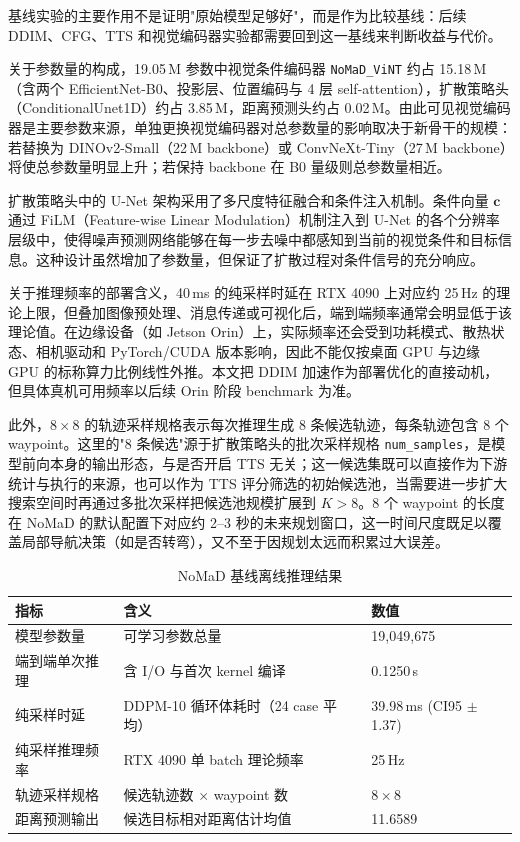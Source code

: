 基线实验的主要作用不是证明"原始模型足够好"，而是作为比较基线：后续 DDIM、CFG、TTS 和视觉编码器实验都需要回到这一基线来判断收益与代价。

关于参数量的构成，19.05\,M 参数中视觉条件编码器 \texttt{NoMaD\_ViNT} 约占 15.18\,M（含两个 EfficientNet-B0、投影层、位置编码与 4 层 self-attention），扩散策略头（ConditionalUnet1D）约占 3.85\,M，距离预测头约占 0.02\,M。由此可见视觉编码器是主要参数来源，单独更换视觉编码器对总参数量的影响取决于新骨干的规模：若替换为 DINOv2-Small（22\,M backbone）或 ConvNeXt-Tiny（27\,M backbone）将使总参数量明显上升；若保持 backbone 在 B0 量级则总参数量相近。

扩散策略头中的 U-Net 架构采用了多尺度特征融合和条件注入机制。条件向量 $\mathbf{c}$ 通过 FiLM（Feature-wise Linear Modulation）机制注入到 U-Net 的各个分辨率层级中，使得噪声预测网络能够在每一步去噪中都感知到当前的视觉条件和目标信息。这种设计虽然增加了参数量，但保证了扩散过程对条件信号的充分响应。

关于推理频率的部署含义，40\,ms 的纯采样时延在 RTX 4090 上对应约 25\,Hz 的理论上限，但叠加图像预处理、消息传递或可视化后，端到端频率通常会明显低于该理论值。在边缘设备（如 Jetson Orin）上，实际频率还会受到功耗模式、散热状态、相机驱动和 PyTorch/CUDA 版本影响，因此不能仅按桌面 GPU 与边缘 GPU 的标称算力比例线性外推。本文把 DDIM 加速作为部署优化的直接动机，但具体真机可用频率以后续 Orin 阶段 benchmark 为准。

此外，$8 \times 8$ 的轨迹采样规格表示每次推理生成 8 条候选轨迹，每条轨迹包含 8 个 waypoint。这里的"8 条候选"源于扩散策略头的批次采样规格 \texttt{num\_samples}，是模型前向本身的输出形态，与是否开启 TTS 无关；这一候选集既可以直接作为下游统计与执行的来源，也可以作为 TTS 评分筛选的初始候选池，当需要进一步扩大搜索空间时再通过多批次采样把候选池规模扩展到 $K > 8$。8 个 waypoint 的长度在 NoMaD 的默认配置下对应约 2--3 秒的未来规划窗口，这一时间尺度既足以覆盖局部导航决策（如是否转弯），又不至于因规划太远而积累过大误差。

\begin{table}[htbp]
    \centering
    \caption{NoMaD 基线离线推理结果}
    \label{tab:baseline-inference}
    \begin{tabular}{lll}
        \toprule
        指标 & 含义 & 数值 \\
        \midrule
        模型参数量 & 可学习参数总量 & 19,049,675 \\
        端到端单次推理 & 含 I/O 与首次 kernel 编译 & 0.1250\,s \\
        纯采样时延 & DDPM-10 循环体耗时（24 case 平均） & 39.98\,ms (CI95 $\pm$1.37) \\
        纯采样推理频率 & RTX 4090 单 batch 理论频率 & 25\,Hz \\
        轨迹采样规格 & 候选轨迹数 $\times$ waypoint 数 & $8\times8$ \\
        距离预测输出 & 候选目标相对距离估计均值 & 11.6589 \\
        \bottomrule
    \end{tabular}
\end{table}

